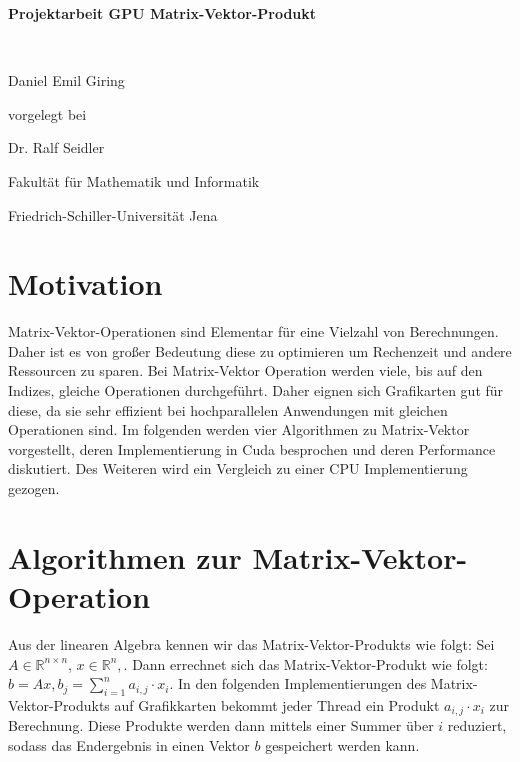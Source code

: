 \documentclass[10pt,a4paper]{article}
\begin{document}
	\begin{center}
		\begin{LARGE}
			\vspace*{1.5cm}
			\textbf{
				Projektarbeit GPU Matrix-Vektor-Produkt
			}
		\end{LARGE}
		\\ \vspace{1.5cm}
		\begin{large}
			Daniel Emil Giring
			\vfill
		\end{large}
		\begin{normalsize}
			vorgelegt bei\\ \vspace{1.5cm}
		\end{normalsize}
		\begin{normalsize}
			Dr. Ralf Seidler
			\\ \vspace{1.5cm}
			
			Fakultät für Mathematik und Informatik\\
		\end{normalsize}
		\vfill%
		\begin{figure}[h]
			\centering
			\centering
		\end{figure}
		\vfill%
		Friedrich-Schiller-Universität Jena
		\\ \vfill%
	\end{center}
	
	\newpage
	\tableofcontents
	\newpage
	\section{Motivation}
	Matrix-Vektor-Operationen sind Elementar für eine Vielzahl von Berechnungen. Daher ist es von großer Bedeutung diese zu optimieren um Rechenzeit und andere Ressourcen zu sparen. Bei Matrix-Vektor Operation werden viele, bis auf den Indizes, gleiche Operationen durchgeführt. Daher eignen sich Grafikarten gut für diese, da sie sehr effizient bei hochparallelen Anwendungen mit gleichen Operationen sind. Im folgenden werden vier Algorithmen zu Matrix-Vektor vorgestellt, deren Implementierung in Cuda besprochen und deren Performance diskutiert. Des Weiteren wird ein Vergleich zu einer CPU Implementierung gezogen.
	\section{Algorithmen zur Matrix-Vektor-Operation}
	Aus der linearen Algebra kennen wir das Matrix-Vektor-Produkts wie folgt: Sei $A \in \mathbb{R}^{n\times n}$, $x\in \mathbb{R}^n,$. Dann errechnet sich das Matrix-Vektor-Produkt wie folgt: $ b=Ax, b_j=\sum_{i=1}^n a_{i,j} \cdot x_i$. In den folgenden Implementierungen des Matrix-Vektor-Produkts auf Grafikkarten bekommt jeder Thread ein Produkt $a_{i,j}\cdot x_i$ zur Berechnung. Diese Produkte werden dann mittels einer Summer über $i$ reduziert, sodass das Endergebnis in einen Vektor $b$ gespeichert werden kann.
\end{document}
